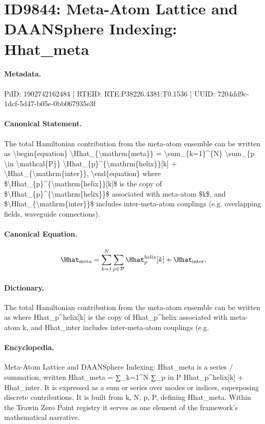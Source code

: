 \section*{ID9844: Meta-Atom Lattice and DAANSphere Indexing: Hhat\_meta}
\paragraph{Metadata.}
PiID: 1902742162484 | RTEID: RTE:P38226.4381:T0.1536 | UUID: 7204dd9c-1dcf-5d47-b05e-0bb067935e3f

\paragraph{Canonical Statement.}
The total Hamiltonian contribution from the meta-atom ensemble can be written as \textbackslash{}begin\{equation\} \textbackslash{}Hhat\_\{\textbackslash{}mathrm\{meta\}\} = \textbackslash{}sum\_\{k=1\}\textasciicircum{}\{N\} \textbackslash{}sum\_\{p \textbackslash{}in \textbackslash{}mathcal\{P\}\} \textbackslash{}Hhat\_\{p\}\textasciicircum{}\{\textbackslash{}mathrm\{helix\}\}[k] + \textbackslash{}Hhat\_\{\textbackslash{}mathrm\{inter\}\}, \textbackslash{}end\{equation\} where \$\textbackslash{}Hhat\_\{p\}\textasciicircum{}\{\textbackslash{}mathrm\{helix\}\}[k]\$ is the copy of \$\textbackslash{}Hhat\_\{p\}\textasciicircum{}\{\textbackslash{}mathrm\{helix\}\}\$ associated with meta-atom \$k\$, and \$\textbackslash{}Hhat\_\{\textbackslash{}mathrm\{inter\}\}\$ includes inter-meta-atom couplings (e.g. overlapping fields, waveguide connections).

\paragraph{Canonical Equation.}
\[
\Hhat_{\mathrm{meta}} = \sum_{k=1}^{N} \sum_{p \in \mathcal{P}} \Hhat_{p}^{\mathrm{helix}}[k] + \Hhat_{\mathrm{inter}},
\]

\paragraph{Dictionary.}
The total Hamiltonian contribution from the meta-atom ensemble can be written as where Hhat\_p\textasciicircum{}helix[k] is the copy of Hhat\_p\textasciicircum{}helix associated with meta-atom k, and Hhat\_inter includes inter-meta-atom couplings (e.g.

\paragraph{Encyclopedia.}
Meta-Atom Lattice and DAANSphere Indexing: Hhat\_meta is a series / summation, written Hhat\_meta = ∑\_k=1\textasciicircum{}N ∑\_p in P Hhat\_p\textasciicircum{}helix[k] + Hhat\_inter. It is expressed as a sum or series over modes or indices, superposing discrete contributions. It is built from k, N, p, P, defining Hhat\_meta. Within the Trawin Zero Point registry it serves as one element of the framework's mathematical narrative.
